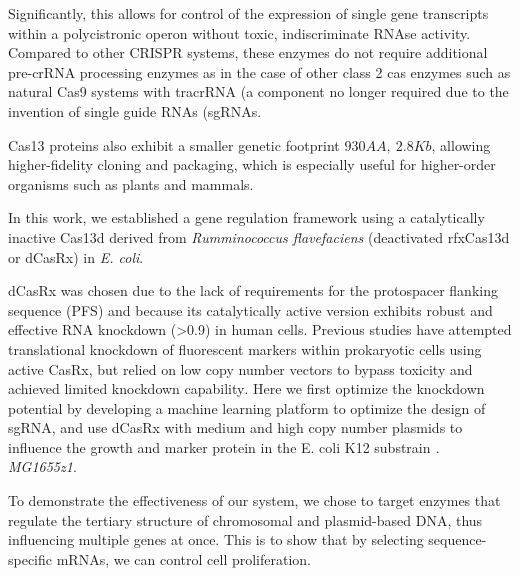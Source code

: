 \documentclass[times]{zHenriquesLab-StyleBioRxiv}
\begin{document}
Significantly, this allows for control of the expression of single gene transcripts within a polycistronic operon without toxic, indiscriminate RNAse activity. Compared to other CRISPR systems, these enzymes do not require additional pre-crRNA processing enzymes as in the case of other class 2 cas enzymes such as natural Cas9 systems with tracrRNA (a component no longer required due to the invention of single guide RNAs (sgRNAs\textsuperscript{\cite{DoudnaCharpentier2014}}.

Cas13 proteins also exhibit a smaller genetic footprint \(930 AA, ~2.8Kb\), allowing higher-fidelity cloning and packaging, which is especially useful for higher-order organisms such as plants and mammals.

In this work, we established a gene regulation framework using a catalytically inactive Cas13d derived from {\it Rumminococcus flavefaciens} (deactivated rfxCas13d or dCasRx) in {\it E. coli}. 

dCasRx was chosen due to the lack of requirements for the protospacer flanking sequence (PFS) and because its catalytically active version exhibits robust and effective RNA knockdown (>0.9)\textsuperscript{\cite{KONERMANN2018665}} in human cells. Previous studies have attempted translational knockdown of fluorescent markers within prokaryotic cells using active CasRx, but relied on low copy number vectors to bypass toxicity and achieved limited knockdown capability\textsuperscript{\cite{Chuang2021}}. Here we first optimize the knockdown potential by developing a machine learning platform to optimize the design of sgRNA, and use dCasRx with medium and high copy number plasmids to influence the growth and marker protein in the E. coli K12 substrain {\it. MG1655z1}.

To demonstrate the effectiveness of our system, we chose to target enzymes that regulate the tertiary structure of chromosomal and plasmid-based DNA, thus influencing multiple genes at once.
This is to show that by selecting sequence-specific mRNAs, we can control cell proliferation.
\end{document}
